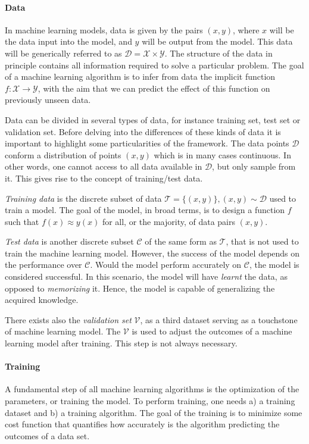 \documentclass[]{report}
\begin{document}
\paragraph{Data}

    In machine learning models, data is given by the pairs $(x, y)$, where $x$ will be the data input into the model, and $y$ will be output from the model. This data will be generically referred to as $\mathcal D = \mathcal X \times \mathcal Y$. The structure of the data in principle contains all information required to solve a particular problem. The goal of a machine learning algorithm is to infer from data the implicit function $f : \mathcal X \rightarrow \mathcal Y$, with the aim that we can predict the effect of this function on previously unseen data. 

    Data can be divided in several types of data, for instance training set, test set or validation set. Before delving into the differences of these kinds of data it is important to highlight some particularities of the framework. The data points $\mathcal D$ conform a distribution of points $(x,y)$ which is in many cases continuous. In other words, one cannot access to all data available in $\mathcal D$, but only sample from it. This gives rise to the concept of training/test data. 

    \textit{Training data} is the discrete subset of data $\mathcal T = \{ (x, y)\}, (x,y) \sim \mathcal D$ used to train a model. The goal of the model, in broad terms, is to design a function $f$ such that $f(x) \approx y(x)$ for all, or the majority, of data pairs $(x, y)$. 

    \textit{Test data} is another discrete subset $\mathcal C$ of the same form as $\mathcal T$, that is not used to train the machine learning model. However, the success of the model depends on the performance over $\mathcal C$. Would the model perform accurately on $\mathcal C$, the model is considered successful. In this scenario, the model will have \textit{learnt} the data, as opposed to \textit{memorizing} it. Hence, the model is capable of generalizing the acquired knowledge. 

    There exists also the \textit{validation set} $\mathcal V$, as a third dataset serving as a touchstone of machine learning model. The $\mathcal V$ is used to adjust the outcomes of a machine learning model after training. This step is not always necessary. 

\paragraph{Training} A fundamental step of all machine learning algorithms is the optimization of the parameters, or training the model. To perform training, one needs a) a training dataset and b) a training algorithm. The goal of the training is to minimize some cost function that quantifies how accurately is the algorithm predicting the outcomes of a data set. 
\end{document}
